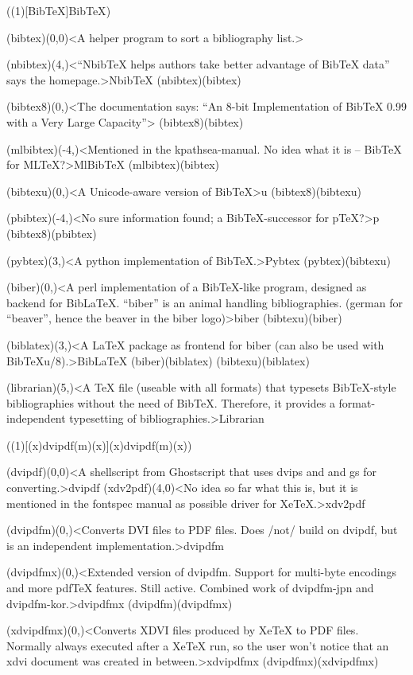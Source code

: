 \tograph(\tostruct(1)[Bib\TeX]{Bib\TeX}){
	\tonode(bibtex)(0,0)<A helper program to sort a bibliography list.>{\BibTeX}
	\steplayer[-1]

	\tonode(nbibtex)(4,\layer)<“NbibTeX helps authors take better advantage of BibTeX data” says the homepage.>{NbibTeX}
	\todraw(nbibtex)(bibtex)
	\steplayer[-0.5]

	\tonode(bibtex8)(0,\layer)<The documentation says: “An 8-bit Implementation of BibTeX 0.99 with a Very Large Capacity”>{}
	\todraw(bibtex8)(bibtex)

	\tonode(mlbibtex)(-4,\layer)<Mentioned in the kpathsea-manual. No idea what it is – BibTeX for MLTeX?>{MlBibTeX}
	\todraw(mlbibtex)(bibtex)
	\steplayer
	
	\tonode(bibtexu)(0,\layer)<A Unicode-aware version of BibTeX>{\BibTeX u}
	\todraw(bibtex8)(bibtexu)

	\tonode(pbibtex)(-4,\layer)<No sure information found; a BibTeX-successor for pTeX?>{p\BibTeX}
	\todraw(bibtex8)(pbibtex)

	\tonode(pybtex)(3,\layer)<A python implementation of BibTeX.>{Pybtex}
	\todraw(pybtex)(bibtexu)
	\steplayer
	
	\tonode(biber)(0,\layer)<A perl implementation of a BibTeX-like program, designed as backend for BibLaTeX. “biber” is an animal handling bibliographies. (german for “beaver”, hence the beaver in the biber logo)>{biber}
	\todraw(bibtexu)(biber)
	
	\tonode[\package](biblatex)(3,\layer)<A LaTeX package as frontend for biber (can also be used with BibTeXu/8).>{Bib\LaTeX}
	\todraw(biber)(biblatex)
	\todraw(bibtexu)(biblatex)
	\steplayer

	\tonode[\package](librarian)(5,\layer)<A TeX file (useable with all formats) that typesets BibTeX-style bibliographies without the need of BibTeX. Therefore, it provides a format-independent typesetting of bibliographies.>{Librarian}
}

\tograph(\tostruct(1)[{(x)dvipdf(m)(x)}]{(x)dvipdf(m)(x)}){
	\tonode(dvipdf)(0,0)<A shellscript from Ghostscript that uses dvips and and gs for converting.>{dvipdf}
	\tonode(xdv2pdf)(4,0)<No idea so far what this is, but it is mentioned in the fontspec manual as possible driver for XeTeX.>{xdv2pdf}
	\steplayer

	\tonode(dvipdfm)(0,\layer)<Converts DVI files to PDF files. Does /not/ build on dvipdf, but is an independent implementation.>{dvipdfm}
	\steplayer

	\tonode(dvipdfmx)(0,\layer)<Extended version of dvipdfm. Support for multi-byte encodings and more pdfTeX features. Still active. Combined work of dvipdfm-jpn and dvipdfm-kor.>{dvipdfmx}
	\todraw(dvipdfm)(dvipdfmx)
	\steplayer

	\tonode(xdvipdfmx)(0,\layer)<Converts XDVI files produced by XeTeX to PDF files. Normally always executed after a XeTeX run, so the user won't notice that an xdvi document was created in between.>{xdvipdfmx}
	\todraw(dvipdfmx)(xdvipdfmx)
}


